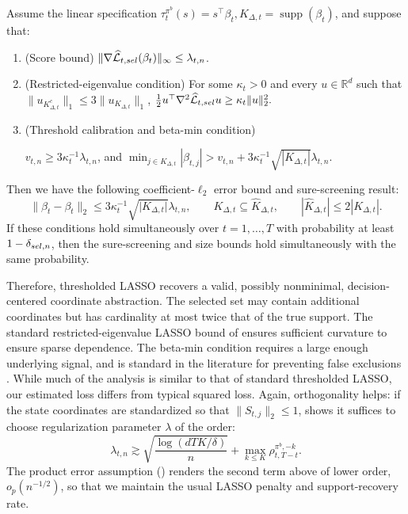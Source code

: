 \documentclass[opre,nonblindrev]{informs4}
\newenvironment{revision}{\begingroup\color{revisionblue}\ignorespaces}{\endgroup}
\newcommand{\norm}[1]{\lVert#1\rVert}
\newcommand{\blipadv}{\tau}
\begin{document}
\begin{revision}
\begin{proposition}
\label{prop:tl-support-main}
Assume the linear specification $\blipadv_t^{\pi^b}(s)=s^\top\beta_t, 
K_{\Delta,t}=\operatorname{supp}(\beta_t)$,
and suppose that:
\begin{enumerate}[label=(\roman*),leftmargin=*,nosep]
\item\label{eq:score-main} (Score bound) $\norm{
    \nabla\widehat{\mathcal L}_{t,\rm sel}(\beta_t)
}_\infty
\le \lambda_{t,n}$.
\item\label{eq:re-main} (Restricted-eigenvalue condition) For some $\kappa_t>0$ and every $u\in\mathbb R^d$ such that $\norm{u_{K_{\Delta,t}^c}}_1
\le
3\norm{u_{K_{\Delta,t}}}_1$,
$\frac12
u^\top
\nabla^2\widehat{\mathcal L}_{t,\rm sel}
u
\ge
\kappa_t\norm{u}_2^2.$
\item\label{asn-lasso-betamin} (Threshold calibration and beta-min condition) 

$v_{t,n}
\ge
3\kappa_t^{-1}\lambda_{t,n}$, and 
$\min_{j\in K_{\Delta,t}}|\beta_{t,j}|
>
v_{t,n}
+3\kappa_t^{-1}\sqrt{|K_{\Delta,t}|}\lambda_{t,n}$.
\end{enumerate}
Then we have the following coefficient-$\ell_2$ error bound and
sure-screening result:
\[
\norm{\hat\beta_t-\beta_t}_2
\le
3\kappa_t^{-1}\sqrt{\lvert K_{\Delta,t}\rvert}\lambda_{t,n},
\qquad
K_{\Delta,t}\subseteq\hat K_{\Delta,t},
\qquad
|\hat K_{\Delta,t}|\le 2|K_{\Delta,t}|.
\]
If these conditions hold simultaneously over
$t=1,\ldots,T$ with probability at least $1-\delta_{\rm sel,n}$, then
the sure-screening and size bounds hold simultaneously with the same probability.
\end{proposition}

Therefore, thresholded LASSO recovers a valid, possibly nonminimal, decision-centered coordinate abstraction. The selected set may contain
additional coordinates but has cardinality at most twice that of the true
support. The standard restricted-eigenvalue LASSO bound of \citet{bickel2009simultaneous} ensures sufficient curvature to ensure sparse dependence. The beta-min condition requires a large enough underlying signal, and is standard in the literature for preventing false exclusions \citep{meinshausen2009lasso,zhou2009thresholding,zhou2010thresholded,van2011adaptive}. While much of the analysis is similar to that of standard thresholded LASSO, our estimated loss differs from typical squared loss. Again, orthogonality helps: if the state coordinates are standardized so that $\norm{S_{t,j}}_2\le1$,  shows it suffices to choose regularization parameter $\lambda$ of the order: 
\begin{equation*}
\lambda_{t,n}
\gtrsim
\sqrt{\frac{\log(dTK/\delta)}{n}}
+
\max_{k\le K}\rho_{t,T-t}^{\pi^b,-k}.
\end{equation*}
The product error assumption () renders the second term above of lower order, $o_p(n^{-1/2})$, so that we maintain the usual LASSO penalty and support-recovery rate. 


\end{revision}
\end{document}
